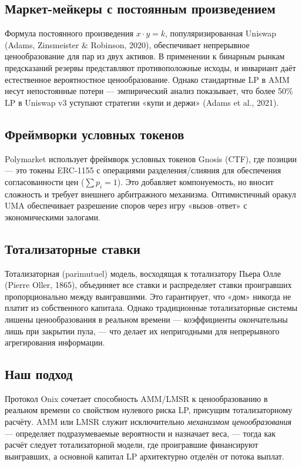 \documentclass{ledger}
\theoremstyle{plain}
\theoremstyle{remark}
\begin{document}
\subsection{Маркет-мейкеры с постоянным произведением}

Формула постоянного произведения $x \cdot y = k$, популяризированная Uniswap
(Adams, Zinsmeister \& Robinson, 2020), обеспечивает непрерывное ценообразование
для пар из двух активов. В применении к бинарным рынкам предсказаний резервы
представляют противоположные исходы, и инвариант даёт естественное вероятностное
ценообразование. Однако стандартные LP в AMM несут непостоянные потери ---
эмпирический анализ показывает, что более 50\% LP в Uniswap v3 уступают стратегии
«купи и держи» (Adams et al., 2021).

\subsection{Фреймворки условных токенов}

Polymarket использует фреймворк условных токенов Gnosis (CTF), где позиции --- это
токены ERC-1155 с операциями разделения/слияния для обеспечения согласованности
цен ($\sum p_i = 1$). Это добавляет компонуемость, но вносит сложность и требует
внешнего арбитражного механизма. Оптимистичный оракул UMA обеспечивает разрешение
споров через игру «вызов--ответ» с экономическими залогами.

\subsection{Тотализаторные ставки}

Тотализаторная (parimutuel) модель, восходящая к тотализатору Пьера Олле (Pierre
Oller, 1865), объединяет все ставки и распределяет ставки проигравших
пропорционально между выигравшими. Это гарантирует, что «дом» никогда не платит
из собственного капитала. Однако традиционные тотализаторные системы лишены
ценообразования в реальном времени --- коэффициенты окончательны лишь при закрытии
пула, --- что делает их непригодными для непрерывного агрегирования информации.

\subsection{Наш подход}

Протокол Onix сочетает способность AMM/LMSR к ценообразованию в реальном времени
со свойством нулевого риска LP, присущим тотализаторному расчёту. AMM или LMSR
служит исключительно \emph{механизмом ценообразования} --- определяет
подразумеваемые вероятности и назначает веса, --- тогда как расчёт следует
тотализаторной модели, где проигравшие финансируют выигравших, а основной капитал
LP архитектурно отделён от потока выплат.
\end{document}
